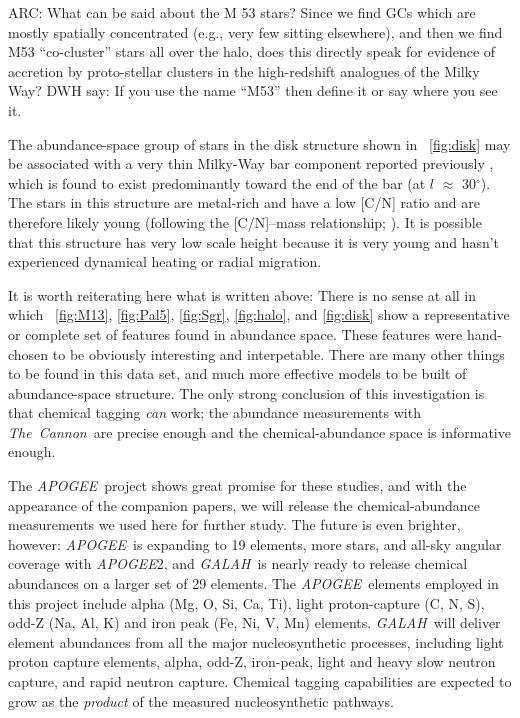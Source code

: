 \documentclass[12pt, letterpaper, preprint]{aastex}
\newcommand{\acronym}[1]{{\small{#1}}}
\newcommand{\project}[1]{\textsl{#1}}
\newcommand{\apogee}{\project{\acronym{APOGEE}}}
\newcommand{\galah}{\project{\acronym{GALAH}}}
\newcommand{\thecannon}{\project{The~Cannon}}
\begin{document}
ARC: What can be said about the M 53 stars? Since we find GCs which are
	mostly spatially concentrated (e.g., very few sitting elsewhere),
	and then we find M53 ``co-cluster'' stars all over the halo, does this
	directly speak for evidence of accretion by proto-stellar clusters
	in the high-redshift analogues of the Milky Way?  DWH say: If you use the name ``M53'' then define it or say where you see it.

The abundance-space group of stars in the disk structure shown in
\figurename~\ref{fig:disk} may be associated with a very thin
Milky-Way bar component reported previously \citep{wegg}, which is
found to exist predominantly toward the end of the bar (at $l$
$\approx$ 30$^\circ$).
The stars in this structure are metal-rich and have a low
[C/N] ratio and are therefore likely young (following the [C/N]--mass
relationship; \citealt{martig}).
It is possible that this structure has very low scale height because
it is very young and hasn't experienced dynamical heating or radial
migration.

It is worth reiterating here what is written above:
There is no sense at all in which \figurename~\ref{fig:M13},
\ref{fig:Pal5}, \ref{fig:Sgr}, \ref{fig:halo}, and \ref{fig:disk} show
a representative or complete set of features found in abundance space.
These features were hand-chosen to be obviously interesting and
interpetable.
There are many other things to be found in this data set, and much
more effective models to be built of abundance-space structure.
The only strong conclusion of this investigation is that chemical
tagging \emph{can} work; the abundance measurements with \thecannon\ are
precise enough and the chemical-abundance space is informative enough.

The \apogee\ project shows great promise for these studies, and with
the appearance of the companion papers, we will release the
chemical-abundance measurements we used here for further study.
The future is even brighter, however: \apogee\ is expanding to 19
elements, more stars, and all-sky angular coverage with \apogee2, and
\galah\ is nearly ready to release chemical abundances on a larger set
of 29 elements.
The \apogee\ elements employed in this project include alpha
(Mg, O, Si, Ca, Ti), light proton-capture (C, N, S), odd-Z (Na, Al, K)
and iron peak (Fe, Ni, V, Mn) elements.
\galah\ will deliver element abundances from all the major
nucleosynthetic processes, including light proton capture elements,
alpha, odd-Z, iron-peak, light and heavy slow neutron capture, and
rapid neutron capture.
Chemical tagging capabilities are expected to grow as the
\emph{product} of the measured nucleosynthetic pathways.
\end{document}
